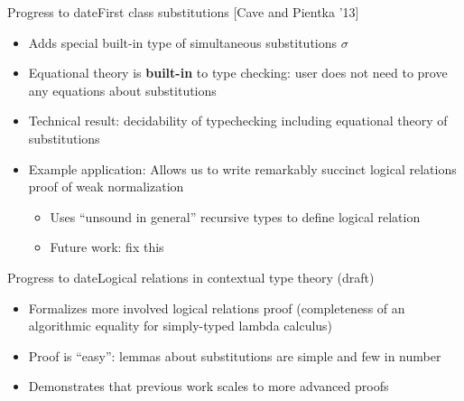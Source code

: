 \documentclass[usenames,dvipsnames]{beamer}
\begin{document}
\begin{frame}{Progress to date}{First class substitutions [Cave and Pientka '13]}
\begin{itemize}
\item Adds special built-in type of simultaneous substitutions $\sigma$
\item Equational theory is \textbf{built-in} to type checking: user does not need to prove any equations about substitutions
\item Technical result: decidability of typechecking including equational theory of substitutions
\item Example application: Allows us to write remarkably succinct logical relations proof of weak normalization
\begin{itemize}
\item Uses ``unsound in general'' recursive types to define logical relation
\item Future work: fix this
\end{itemize}
\end{itemize}
\end{frame}

\begin{frame}{Progress to date}{Logical relations in contextual type theory (draft)}
\begin{itemize}
\item Formalizes more involved logical relations proof (completeness of an algorithmic equality for simply-typed lambda calculus)
\item Proof is ``easy'': lemmas about substitutions are simple and few in number
\item Demonstrates that previous work scales to more advanced proofs
\end{itemize}
\end{frame}
\end{document}
